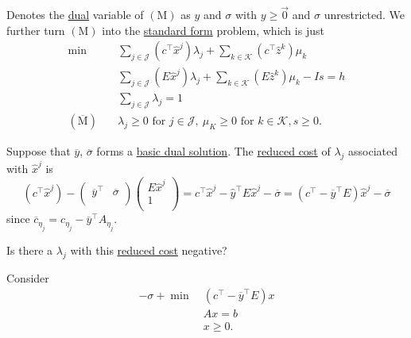 Denotes the \hyperref[def:dual]{dual} variable of \((\mathrm{M})\) as \(y\) and \(\sigma\) with \(y\geq \vec{0}\) and \(\sigma\) unrestricted. We further turn \((\mathrm{M})\) into the \hyperref[def:standard-form]{standard form} problem, which is just
\[
	\begin{aligned}
		\min~                        & \sum\limits_{j\in\mathcal{J}}\left(c^{\top}\hat{x}^j\right)\lambda_{j} + \sum\limits_{k\in\mathcal{K}}\left(c^{\top} \hat{z}^k  \right)\mu_k \\
		                             & \sum\limits_{j\in\mathcal{J}}\left(E\hat{x}^j\right)\lambda_{j} + \sum\limits_{k\in\mathcal{K}}\left(E \hat{z}^k \right)\mu_k - Is = h       \\
		                             & \sum\limits_{j\in\mathcal{J}}\lambda_{j} = 1                                                                                                 \\
		(\overline{\mathrm{M}})\quad & \lambda_{j}\geq 0 \text{ for }j\in\mathcal{J},\ \mu_K\geq 0 \text{ for }k\in\mathcal{K}, s\geq 0.
	\end{aligned}
\]

Suppose that \(\overline{y}\), \(\overline{\sigma}\) forms a \hyperref[def:dual-basic-solution]{basic dual solution}. The \hyperref[def:reduced-cost]{reduced cost}
of \(\lambda_{j}\) associated with \(\hat{x}^j\) is
\[
	(c^{\top}\hat{x}^j) - \begin{pmatrix}
		\overline{y}^{\top} & \overline{\sigma} \\
	\end{pmatrix}\begin{pmatrix}
		E\hat{x}^j \\
		1          \\
	\end{pmatrix} = c^{\top}\hat{x}^j - \hat{y}^{\top}E\hat{x}^j - \overline{\sigma} = (c^{\top} - \overline{y}^{\top}E)\hat{x}^j - \overline{\sigma}
\]
since \(\overline{c}_{\eta_{j}} = c_{\eta_{j}} - \overline{y}^{\top}A_{\eta_{j}}\).

\begin{problem}
Is there a \(\lambda_{j}\) with this \hyperref[def:reduced-cost]{reduced cost} negative?
\end{problem}
\begin{answer}
	Consider
	\[
		\begin{aligned}
			-\sigma + \min~ & (c^{\top} - \overline{y}^{\top}E)x \\
			                & Ax = b                             \\
			                & x\geq 0.
		\end{aligned}
	\]
\end{answer}

